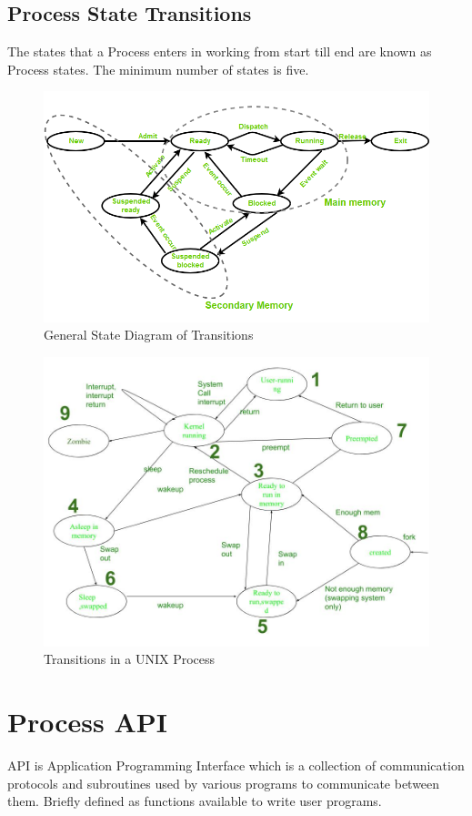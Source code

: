 \documentclass{article}
\begin{document}
\subsection{Process State Transitions}
The states that a Process enters in working from start till end are known as Process states. The minimum number of states is five.
    \begin{figure}[Ht]
     \centering
     \includegraphics[scale = 0.565]{img/states_modified.png}
     \caption{General State Diagram of Transitions}
    \end{figure}
    \begin{figure}[Ht]
     \centering
     \includegraphics[scale = 0.35]{img/transitions.jpg}
     \caption{Transitions in a UNIX Process}
    \end{figure}

\section{Process API}
API is Application Programming Interface which is a collection of communication protocols and subroutines used by various programs to communicate between them. Briefly defined as functions available to write user programs.
\end{document}
